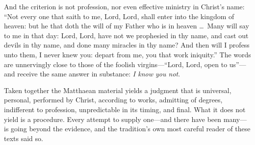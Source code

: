 And the criterion is not profession, nor even effective ministry in Christ's name: ``Not every one that saith to me, Lord, Lord, shall enter into the kingdom of heaven: but he that doth the will of my Father who is in heaven \ldots\ Many will say to me in that day: Lord, Lord, have not we prophesied in thy name, and cast out devils in thy name, and done many miracles in thy name? And then will I profess unto them, I never knew you: depart from me, you that work iniquity.'' The words are unnervingly close to those of the foolish virgins---``Lord, Lord, open to us''---and receive the same answer in substance: \emph{I know you not}.

Taken together the Matthaean material yields a judgment that is universal, personal, performed by Christ, according to works, admitting of degrees, indifferent to profession, unpredictable in its timing, and final. What it does not yield is a procedure. Every attempt to supply one---and there have been many---is going beyond the evidence, and the tradition's own most careful reader of these texts said so.
